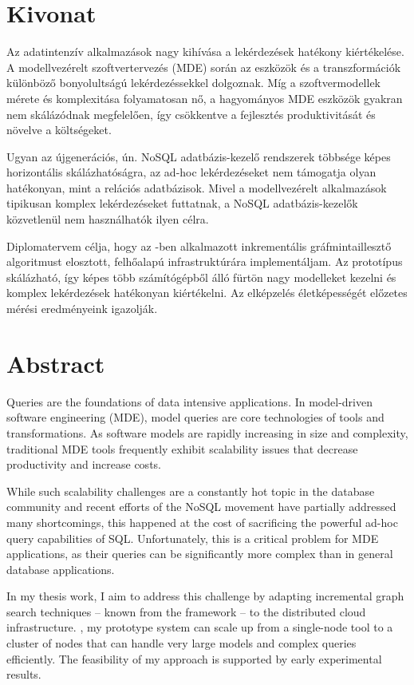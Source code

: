 \chapter*{Kivonat}

Az adatintenzív alkalmazások nagy kihívása a lekérdezések hatékony kiértékelése. A modellvezérelt szoftvertervezés (MDE) során az eszközök és a transzformációk különböző bonyolultságú lekérdezéssekkel dolgoznak. Míg a szoftvermodellek mérete és komplexitása folyamatosan nő, a hagyományos MDE eszközök gyakran nem skálázódnak megfelelően, így csökkentve a fejlesztés produktivitását és növelve a költségeket.

Ugyan az újgenerációs, ún. NoSQL adatbázis-kezelő rendszerek többsége képes horizontális skálázhatóságra, az ad-hoc lekérdezéseket nem támogatja olyan hatékonyan, mint a relációs adatbázisok. Mivel a modellvezérelt alkalmazások tipikusan komplex lekérdezéseket futtatnak, a NoSQL adatbázis-kezelők közvetlenül nem használhatók ilyen célra.

Diplomatervem célja, hogy az \eiq{}-ben alkalmazott inkrementális gráfmintaillesztő algoritmust elosztott, felhőalapú infrastruktúrára implementáljam. Az \iqd{} prototípus skálázható, így képes több számítógépből álló fürtön nagy modelleket kezelni és komplex lekérdezések hatékonyan kiértékelni. Az elképzelés életképességét előzetes mérési eredményeink igazolják.

\vfill

\chapter*{Abstract}

Queries are the foundations of data intensive applications. In model-driven software engineering (MDE), model queries are core technologies of tools and transformations. As software models are rapidly increasing in size and complexity, traditional MDE tools frequently exhibit scalability issues that decrease productivity and increase costs.

While such scalability challenges are a constantly hot topic in the database community and recent efforts of the NoSQL movement have partially addressed many shortcomings, this happened at the cost of sacrificing the powerful ad-hoc query capabilities of SQL. Unfortunately, this is a critical problem for MDE applications, as their queries can be significantly more complex than in general database applications.

In my thesis work, I aim to address this challenge by adapting incremental graph search techniques -- known from the \eiq{} framework -- to the distributed cloud infrastructure. \iqd, my prototype system can scale up from a single-node tool to a cluster of nodes that can handle very large models and complex queries efficiently. The feasibility of my approach is supported by early experimental results.

\vfill

